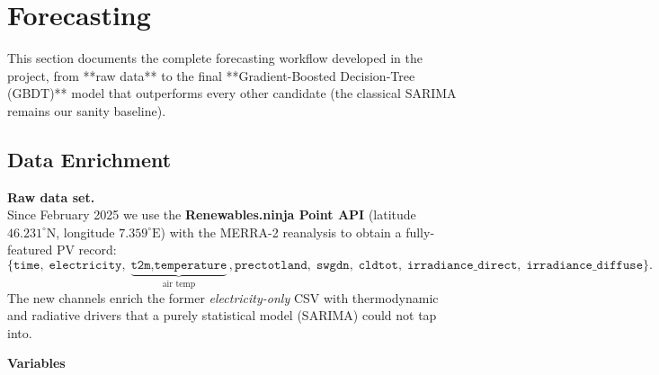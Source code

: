 \newpage
\section{Forecasting}
\label{sec:forecasting}

This section documents the complete forecasting workflow developed in the
project, from **raw data** to the final **Gradient-Boosted Decision‐Tree
(GBDT)** model that outperforms every other candidate (the classical SARIMA
remains our sanity baseline).

\subsection{Data Enrichment}
\label{subsec:data-enrich}

\textbf{Raw data set.} \\
    Since February 2025 we use the \textbf{Renewables.ninja Point API}
    (latitude ${46.231^{\circ}\mathrm{N}}$, longitude ${7.359^{\circ}\mathrm{E}}$)
    with the MERRA-2 reanalysis to obtain a fully-featured PV record:
    \[
    \{\texttt{time},\;
    \texttt{electricity},\;
    \underbrace{\texttt{t2m},\texttt{temperature}}_{\text{air temp}},
    \texttt{prectotland},\;
    \texttt{swgdn},\;
    \texttt{cldtot},\;
    \texttt{irradiance\_direct},\;
    \texttt{irradiance\_diffuse}\}.
    \]
    The new channels enrich the former \emph{electricity-only} CSV with
    thermodynamic and radiative drivers that a purely statistical model
    (SARIMA) could not tap into.

\textbf{Variables} \\
    \noindent


